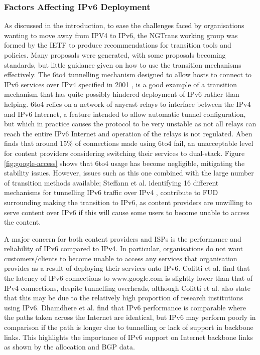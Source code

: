 \subsubsection{Factors Affecting IPv6 Deployment}

As discussed in the introduction, to ease the challenges faced by organisations
wanting to move away from IPV4 to IPv6, the NGTrans working group was formed by
the IETF to produce recommendations for transition tools and policies. Many
proposals were generated, with some proposals becoming standards, but little
guidance given on how to use the transition mechanisms effectively. The 6to4
tunnelling mechanism designed to allow hosts to connect to IPv6 services over
IPv4 specified in 2001 \cite{rfc3056}, is a good example of a transition mechanism that
has quite possibly hindered deployment of IPv6 rather than helping. 6to4 relies
on a network of anycast relays to interface between the IPv4 and IPv6 Internet,
a feature intended to allow automatic tunnel configuration, but which in
practice causes the protocol to be very unstable as not all relays can reach the
entire IPv6 Internet and operation of the relays is not regulated. Aben finds
that around 15\% of connections made using 6to4 fail\cite{aben_6to4_2011}, an unacceptable
level for content providers considering switching their services to dual-stack.
Figure \ref{fig:google-access} shows that 6to4 usage has become negligible,
mitigating the stability issues. However, issues such as this one combined with
the large number of transition methods available; Steffann et al.
identifying 16 different mechanisms for tunnelling IPv6 traffic over IPv4
\cite{draft-steffann-tunnels},
contribute to FUD surrounding making the transition to IPv6, as content
providers are unwilling to serve content over IPv6 if this will cause some users
to become unable to access the content.

A major concern for both content providers and ISPs is the performance and
reliability of IPv6 compared to IPv4. In particular, organisations do not want
customers/clients to become unable to access any services that organisation
provides as a result of deploying their services onto IPv6. Colitti et al. find
that the latency of IPv6 connections to www.google.com is slightly lower than that
of IPv4 connections, despite tunnelling overheads, although Colitti et al. also
state that this may be due to the relatively high proportion of research
institutions using IPv6. Dhamdhere et al. find that IPv6 performance is
comparable where the paths taken across the Internet are identical, but IPv6 may
perform poorly in comparison if the path is longer due to tunnelling or lack of support in
backbone links. This highlights the importance of IPv6 support on Internet
backbone links as shown by the allocation and BGP data.

